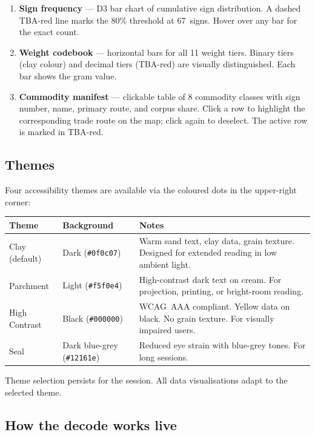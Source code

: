 \begin{enumerate}
\item \textbf{Sign frequency} --- D3 bar chart of cumulative sign
  distribution. A dashed TBA-red line marks the 80\% threshold at
  67~signs. Hover over any bar for the exact count.
\item \textbf{Weight codebook} --- horizontal bars for all 11 weight
  tiers. Binary tiers (clay colour) and decimal tiers (TBA-red)
  are visually distinguished. Each bar shows the gram value.
\item \textbf{Commodity manifest} --- clickable table of 8
  commodity classes with sign number, name, primary route, and
  corpus share. Click a row to highlight the corresponding trade
  route on the map; click again to deselect. The active row is
  marked in TBA-red.
\end{enumerate}

\subsection{Themes}

Four accessibility themes are available via the coloured dots in the
upper-right corner:

\begin{longtable}{@{}llp{7cm}@{}}
\toprule
Theme & Background & Notes \\
\midrule
\endfirsthead
\bottomrule
\endlastfoot
Clay (default) & Dark (\texttt{\#0f0c07}) & Warm sand text, clay data, grain texture. Designed for extended reading in low ambient light. \\
\midrule
Parchment & Light (\texttt{\#f5f0e4}) & High-contrast dark text on cream. For projection, printing, or bright-room reading. \\
\midrule
High Contrast & Black (\texttt{\#000000}) & WCAG~AAA compliant. Yellow data on black. No grain texture. For visually impaired users. \\
\midrule
Seal & Dark blue-grey (\texttt{\#12161e}) & Reduced eye strain with blue-grey tones. For long sessions. \\
\end{longtable}

\noindent
Theme selection persists for the session. All data visualisations
adapt to the selected theme.

\subsection{How the decode works live}

